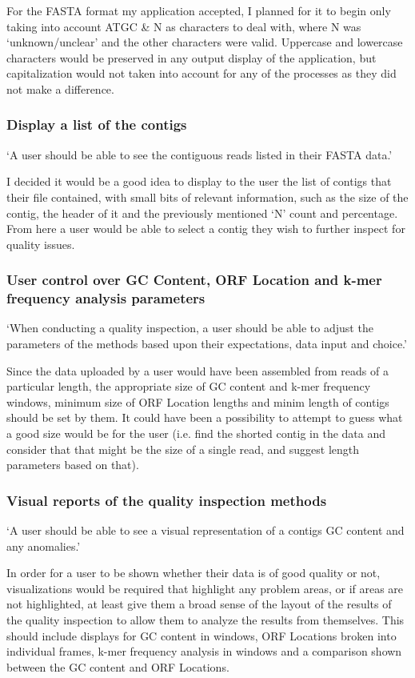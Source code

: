 For the FASTA format my application accepted, I planned for it to begin only taking into account ATGC \& N as characters to deal with, where N was `unknown/unclear' and the other characters were valid. Uppercase and lowercase characters would be preserved in any output display of the application, but capitalization would not taken into account for any of the processes as they did not make a difference.

\subsubsection{Display a list of the contigs}
`A user should be able to see the contiguous reads listed in their FASTA data.'

I decided it would be a good idea to display to the user the list of contigs that their file contained, with small bits of relevant information, such as the size of the contig, the header of it and the previously mentioned `N' count and percentage. From here a user would be able to select a contig they wish to further inspect for quality issues.

\subsubsection{User control over GC Content, ORF Location and k-mer frequency analysis parameters}
`When conducting a quality inspection, a user should be able to adjust the parameters of the methods based upon their expectations, data input and choice.'

Since the data uploaded by a user would have been assembled from reads of a particular length, the appropriate size of GC content and k-mer frequency windows, minimum size of ORF Location lengths and minim length of contigs should be set by them. It could have been a possibility to attempt to guess what a good size would be for the user (i.e. find the shorted contig in the data and consider that that might be the size of a single read, and suggest length parameters based on that).

\subsubsection{Visual reports of the quality inspection methods}
`A user should be able to see a visual representation of a contigs GC content and any anomalies.'

In order for a user to be shown whether their data is of good quality or not, visualizations would be required that highlight any problem areas, or if areas are not highlighted, at least give them a broad sense of the layout of the results of the quality inspection to allow them to analyze the results from themselves. This should include displays for GC content in windows, ORF Locations broken into individual frames, k-mer frequency analysis in windows and a comparison shown between the GC content and ORF Locations.

